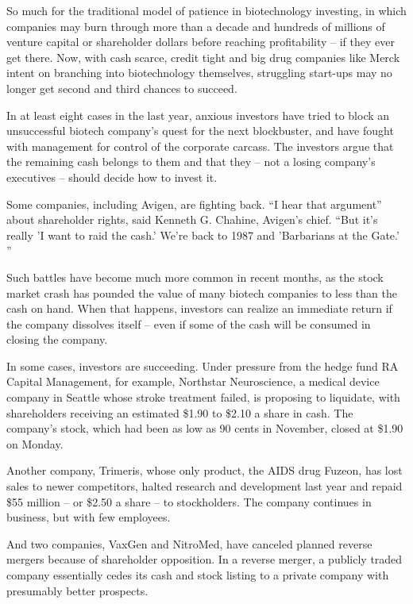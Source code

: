 \documentclass[12pt,a4paper,onecolumn]{article}
\begin{document}
\begin{CJK*}{GBK}{song}
So much for the traditional model of patience in biotechnology investing, in which companies may
burn through more than a decade and hundreds of millions of venture capital or shareholder dollars
before reaching profitability -- if they ever get there. Now, with cash scarce, credit tight and big
drug companies like Merck intent on branching into biotechnology themselves, struggling start-ups
may no longer get second and third chances to succeed.

In at least eight cases in the last year, anxious investors have tried to block an unsuccessful
biotech company's quest for the next blockbuster, and have fought with management for control of the
corporate carcass. The investors argue that the remaining cash belongs to them and that they -- not
a losing company's executives -- should decide how to invest it.

Some companies, including Avigen, are fighting back. ``I hear that argument'' about shareholder
rights, said Kenneth G. Chahine, Avigen's chief. ``But it's really 'I want to raid the cash.' We're
back to 1987 and 'Barbarians at the Gate.' ''

Such battles have become much more common in recent months, as the stock market crash has pounded
the value of many biotech companies to less than the cash on hand. When that happens, investors can
realize an immediate return if the company dissolves itself -- even if some of the cash will be
consumed in closing the company.

In some cases, investors are succeeding. Under pressure from the hedge fund RA Capital Management,
for example, Northstar Neuroscience, a medical device company in Seattle whose stroke treatment
failed, is proposing to liquidate, with shareholders receiving an estimated \$1.90 to \$2.10 a share
in cash. The company's stock, which had been as low as 90 cents in November, closed at \$1.90 on
Monday.

Another company, Trimeris, whose only product, the AIDS drug Fuzeon, has lost sales to newer
competitors, halted research and development last year and repaid \$55 million -- or \$2.50 a share
-- to stockholders. The company continues in business, but with few employees.

And two companies, VaxGen and NitroMed, have canceled planned reverse mergers because of shareholder
opposition. In a reverse merger, a publicly traded company essentially cedes its cash and stock
listing to a private company with presumably better prospects.


\end{CJK*}
\end{document}
